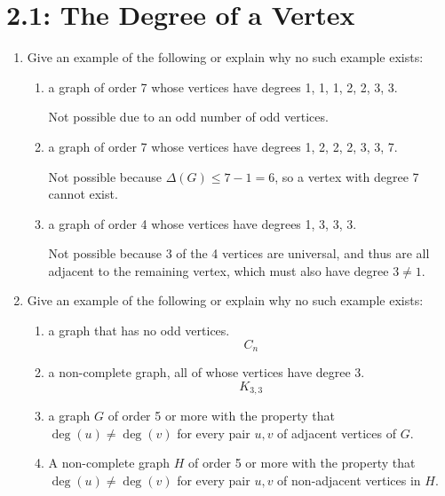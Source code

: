 \documentclass[letterpaper,12pt,fleqn]{article}
\newcommand{\D}{\Delta}
\begin{document}
\section*{2.1: The Degree of a Vertex}

\begin{enumerate}
\item Give an example of the following or explain why no such example exists:
  \begin{enumerate}
  \item a graph of order 7 whose vertices have degrees 1, 1, 1, 2, 2, 3, 3.

    Not possible due to an odd number of odd vertices.

  \item a graph of order 7 whose vertices have degrees 1, 2, 2, 2, 3, 3, 7.

    Not possible because \(\D(G)\le7-1=6\), so a vertex with degree 7 cannot exist.

  \item a graph of order 4 whose vertices have degrees 1, 3, 3, 3.

    Not possible because 3 of the 4 vertices are universal, and thus are all adjacent to the remaining vertex, which
    must also have degree \(3\ne1\).
  \end{enumerate}

\item Give an example of the following or explain why no such example exists:
  \begin{enumerate}
  \item a graph that has no odd vertices.
    \[C_n\]
  \item a non-complete graph, all of whose vertices have degree 3.
    \[K_{3,3}\]
  \item a graph \(G\) of order 5 or more with the property that \(\deg(u)\ne\deg(v)\) for every pair \(u,v\) of
    adjacent vertices of \(G\).
    \begin{quote}
    \end{quote}

  \item A non-complete graph \(H\) of order 5 or more with the property that \(\deg(u)\ne\deg(v)\) for every pair
    \(u,v\) of non-adjacent vertices in \(H\).
    \begin{quote}
    \end{quote}
  \end{enumerate}


\end{enumerate}
\end{document}
